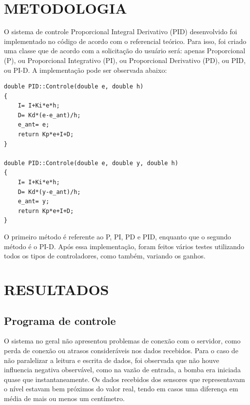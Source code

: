\documentclass[a4paper,12pt]{article}
\begin{document}
\newpage


\thispagestyle{main}

\section{METODOLOGIA}

\hspace{4ex}O sistema de controle Proporcional Integral Derivativo (PID) desenvolvido foi implementado no código de acordo com o referencial teórico. Para isso, foi criado uma classe que de acordo com a solicitação do usuário será: apenas Proporcional (P), ou Proporcional Integrativo (PI), ou Proporcional Derivativo (PD), ou PID, ou PI-D. A implementação pode ser observada abaixo:

\begin{lstlisting}
double PID::Controle(double e, double h)
{
    I= I+Ki*e*h;
    D= Kd*(e-e_ant)/h;
    e_ant= e;
    return Kp*e+I+D;
}

double PID::Controle(double e, double y, double h)
{
    I= I+Ki*e*h;
    D= Kd*(y-e_ant)/h;
    e_ant= y;
    return Kp*e+I+D;
}
\end{lstlisting}

\hspace{4ex}O primeiro método é referente ao P, PI, PD e PID, enquanto que o segundo método é o PI-D.
\hspace{4ex}Após essa implementação, foram feitos vários testes utilizando todos os tipos de controladores, como também, variando os ganhos.

\newpage


\thispagestyle{main}

\section{RESULTADOS}

\hspace{4ex}

\subsection{Programa de controle}
O sistema no geral não apresentou problemas de conexão com o servidor, como perda de conexão ou atrasos consideráveis nos dados recebidos. Para o caso de não paralelizar a leitura e escrita de dados, foi observada que não houve influencia negativa observável, como na vazão de entrada, a bomba era iniciada quase que instantaneamente. Os dados recebidos dos sensores que representavam o nível estavam bem próximos do valor real, tendo em casos uma diferença em média de mais ou menos um centímetro. 
\end{document}
